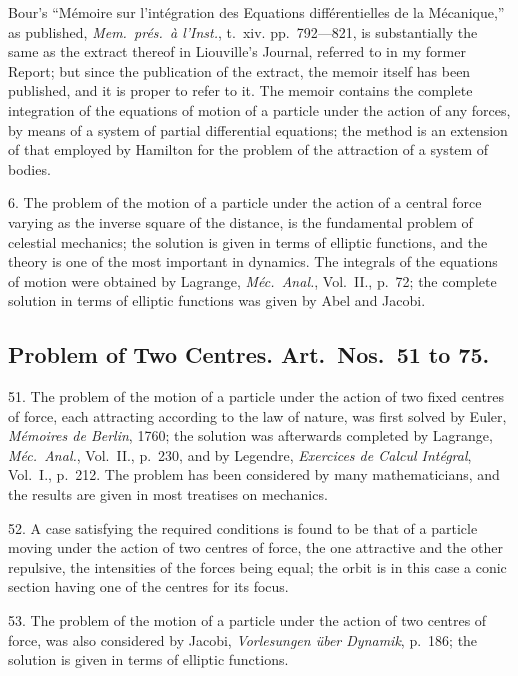 \documentclass[11pt,a4paper]{article}
\begin{document}
\newpage
\setcounter{page}{515}

Bour's ``M\'emoire sur l'int\'egration des Equations diff\'erentielles de la M\'ecanique,'' as published, \textit{Mem.\ pr\'es.\ \`a l'Inst.}, t.~xiv. pp.~792---821, is substantially the same as the extract thereof in Liouville's Journal, referred to in my former Report; but since the publication of the extract, the memoir itself has been published, and it is proper to refer to it. The memoir contains the complete integration of the equations of motion of a particle under the action of any forces, by means of a system of partial differential equations; the method is an extension of that employed by Hamilton for the problem of the attraction of a system of bodies.

6. The problem of the motion of a particle under the action of a central force varying as the inverse square of the distance, is the fundamental problem of celestial mechanics; the solution is given in terms of elliptic functions, and the theory is one of the most important in dynamics. The integrals of the equations of motion were obtained by Lagrange, \textit{M\'ec.\ Anal.}, Vol.~II., p.~72; the complete solution in terms of elliptic functions was given by Abel and Jacobi.

\subsection*{Problem of Two Centres. Art.\ Nos.\ 51 to 75.}

51. The problem of the motion of a particle under the action of two fixed centres of force, each attracting according to the law of nature, was first solved by Euler, \textit{M\'emoires de Berlin}, 1760; the solution was afterwards completed by Lagrange, \textit{M\'ec.\ Anal.}, Vol.~II., p.~230, and by Legendre, \textit{Exercices de Calcul Int\'egral}, Vol.~I., p.~212. The problem has been considered by many mathematicians, and the results are given in most treatises on mechanics.

52. A case satisfying the required conditions is found to be that of a particle moving under the action of two centres of force, the one attractive and the other repulsive, the intensities of the forces being equal; the orbit is in this case a conic section having one of the centres for its focus.

53. The problem of the motion of a particle under the action of two centres of force, was also considered by Jacobi, \textit{Vorlesungen \"uber Dynamik}, p.~186; the solution is given in terms of elliptic functions.
\end{document}
